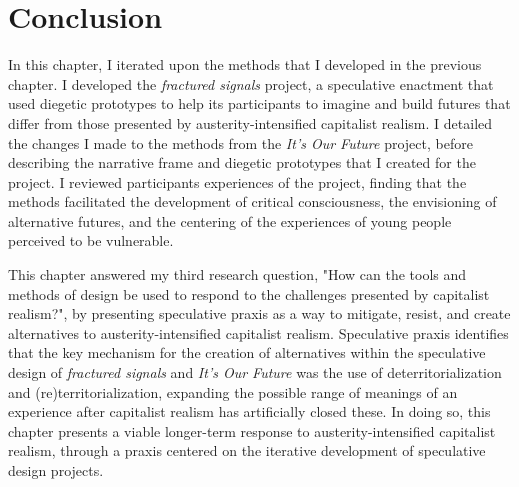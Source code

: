 \section{Conclusion}
In this chapter, I iterated upon the methods that I developed in the previous chapter. I developed the \textit{fractured signals} project, a speculative enactment that used diegetic prototypes to help its participants to imagine and build futures that differ from those presented by austerity-intensified capitalist realism. I detailed the changes I made to the methods from the \textit{It's Our Future} project, before describing the narrative frame and diegetic prototypes that I created for the project. I reviewed participants experiences of the project, finding that the methods facilitated the development of critical consciousness, the envisioning of alternative futures, and the centering of the experiences of young people perceived to be vulnerable.

This chapter answered my third research question, "How can the tools and methods of design be used to respond to the challenges presented by capitalist realism?", by presenting speculative praxis as a way to mitigate, resist, and create alternatives to austerity-intensified capitalist realism. Speculative praxis identifies that the key mechanism for the creation of alternatives within the speculative design of \textit{fractured signals} and \textit{It's Our Future} was the use of deterritorialization and (re)territorialization, expanding the possible range of meanings of an experience after capitalist realism has artificially closed these. In doing so, this chapter presents a viable longer-term response to austerity-intensified capitalist realism, through a praxis centered on the iterative development of speculative design projects. 